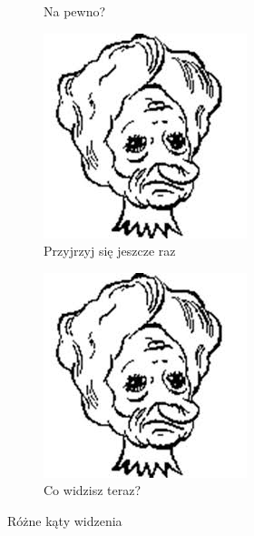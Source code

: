 \documentclass{article}
\begin{document}
\begin{figure}[h!]
\begin{subfigure}[b]{0.4\linewidth}
    \caption{Na pewno?}
  \end{subfigure}
  \begin{subfigure}[b]{0.4\linewidth}
    \includegraphics[width=\linewidth,  angle=95]{images.jpg}
    \caption{Przyjrzyj się jeszcze raz}
  \end{subfigure}
  \begin{subfigure}[b]{0.4\linewidth}
    \includegraphics[width=\linewidth,  angle=180]{images.jpg}
    \caption{Co widzisz teraz?}
  \end{subfigure}
  \caption{Różne kąty widzenia}
  \label{fig:edytory}
\end{figure}
\end{document}
